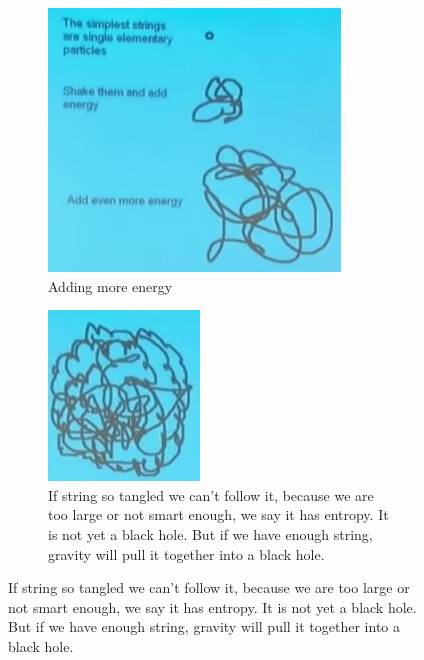 \documentclass[]{article}
\begin{document}
{\begin{appendices}
	\begin{figure}[H]
		\caption{String Theory is a theory where elementary particles are tiny pieces of string}
		\begin{subfigure}[t]{0.3\textwidth}
			\caption{Adding more energy}
			\includegraphics[width=\textwidth]{wh-strings}
		\end{subfigure}
		\;
		\begin{subfigure}[t]{0.3\textwidth}
			\caption{If string so tangled we can't follow it, because we are too large or not smart enough, we say it has entropy. It is not yet a black hole. But if we have enough string, gravity will pull it together into a black hole.}
			\includegraphics[width=\textwidth]{wh-string-tangle}

\end{subfigure}
\end{figure}
\end{appendices}}
\end{document}
